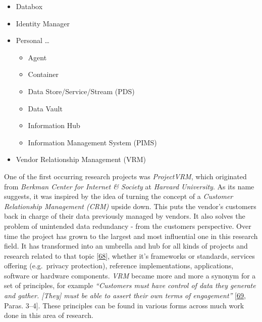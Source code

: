 \documentclass[12pt,english,a4paper,titlepage,cleardoublepage=empty,dottedtoc]{report}
\providecommand{\tightlist}{%
  \setlength{\itemsep}{0pt}\setlength{\parskip}{0pt}}
\begin{document}
\newpage

\begin{itemize}
\tightlist
\item
  Databox
\item
  Identity Manager
\item
  Personal \ldots{}

  \begin{itemize}
  \tightlist
  \item
    Agent
  \item
    Container
  \item
    Data Store/Service/Stream (PDS)
  \item
    Data Vault
  \item
    Information Hub
  \item
    Information Management System (PIMS)
  \end{itemize}
\item
  Vendor Relationship Management (VRM)
\end{itemize}

One of the first occurring research projects was \emph{ProjectVRM},
which originated from \emph{Berkman Center for Internet \& Society} at
\emph{Harvard University}. As its name suggests, it was inspired by the
idea of turning the concept of a \emph{Customer Relationship Management
(CRM)} upside down. This puts the vendor's customers back in charge of
their data previously managed by vendors. It also solves the problem of
unintended data redundancy - from the customers perspective. Over time
the project has grown to the largest and most influential one in this
research field. It has transformed into an umbrella and hub for all
kinds of projects and research related to that topic
{[}\protect\hyperlink{ref-web_2016_projectvrm_development-work}{68}{]},
whether it's frameworks or standards, services offering (e.g.~privacy
protection), reference implementations, applications, software or
hardware components. \emph{VRM} became more and more a synonym for a set
of principles, for example \emph{``Customers must have control of data
they generate and gather. {[}They{]} must be able to assert their own
terms of engagement''}
{[}\protect\hyperlink{ref-web_2016_projectvrm_principles}{69}, Paras.
3--4{]}. These principles can be found in various forms across much work
done in this area of research.
\end{document}
